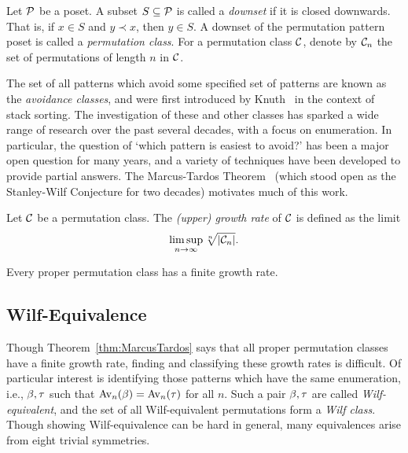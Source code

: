     \begin{definition}\label{prelim:def:class}
      Let $\mathcal{P}$ be a poset. A subset $S \subseteq \mathcal{P}$ is called a
      \emph{downset} if it is closed downwards. That is, if $x \in S$ and $y
      \prec x$, then $y \in S$. 
      A downset of the permutation pattern poset is called a \emph{permutation
      class}. For a permutation class $\mathcal{C}$, denote by $\mathcal{C}_n$ the set of
      permutations of length $n$ in $\mathcal{C}$. 
    \end{definition}


    The set of all patterns which avoid some specified set of patterns are
    known as the \emph{avoidance classes}, and were first introduced by
    Knuth~\cite{Knuth} in the context of stack sorting.  The investigation of
    these and other classes has sparked a wide range of research over the past
    several decades, with a focus on enumeration.  In
    particular, the question of `which pattern is easiest to avoid?' has been a
    major open question for many years, and a variety of techniques have been
    developed to provide partial answers. The Marcus-Tardos
    Theorem~\cite{MarcusTardos} (which stood open as the Stanley-Wilf
    Conjecture for two decades) motivates much of this work.

    \begin{definition} \label{prelim:def:growthrate}
      Let $\mathcal{C}$ be a permutation class. The \emph{(upper) growth rate} of $\mathcal{C}$ is
      defined as the limit
      $$ \limsup_{n \rightarrow \infty} \sqrt[n]{|\mathcal{C}_n|}.$$
    \end{definition}

    \begin{theorem} \label{thm:MarcusTardos}
      Every proper permutation class has a finite growth rate. 
    \end{theorem}



  \subsection{Wilf-Equivalence}
    
    Though Theorem~\ref{thm:MarcusTardos} says that all proper permutation classes
    have a finite growth rate, finding and classifying these growth
    rates is difficult. Of particular interest is identifying
    those patterns which have the same enumeration, i.e., $\beta, \tau$ such
    that $\operatorname{{Av}}_n(\beta) = \operatorname{{Av}}_n(\tau)$ for all $n$. Such a pair $\beta, \tau$ are
    called \emph{Wilf-equivalent}, and the set of all Wilf-equivalent
    permutations form a \emph{Wilf class}. Though showing Wilf-equivalence can be
    hard in general, many equivalences arise from eight trivial symmetries. 

